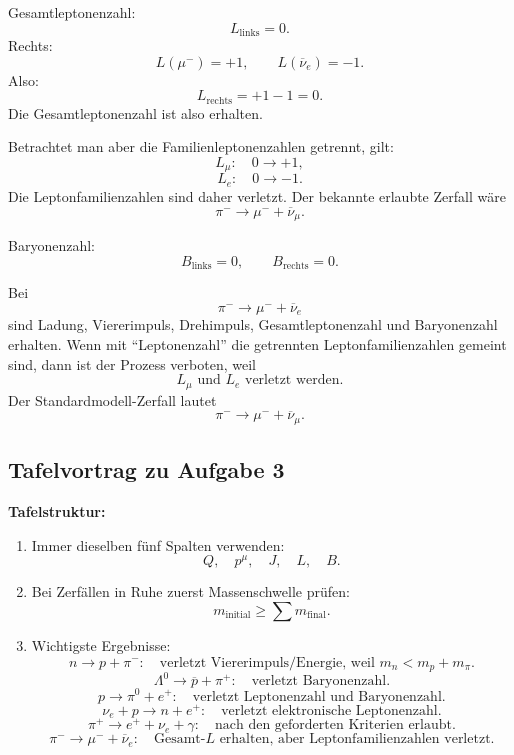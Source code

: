 \documentclass[11pt,a4paper]{scrartcl}
\theoremstyle{definition}
\theoremstyle{plain}
\theoremstyle{remark}
\begin{document}
\begin{enumerate}[label=(\alph*)]
\begin{calculationbox}
        Gesamtleptonenzahl:
        \[
            L_{\mathrm{links}}=0.
        \]
        Rechts:
        \[
            L(\mu^-)=+1,
            \qquad
            L(\overline\nu_e)=-1.
        \]
        Also:
        \[
            L_{\mathrm{rechts}}=+1-1=0.
        \]
        Die Gesamtleptonenzahl ist also erhalten.

        Betrachtet man aber die Familienleptonenzahlen getrennt, gilt:
        \[
            L_\mu:\quad 0\to +1,
        \]
        \[
            L_e:\quad 0\to -1.
        \]
        Die Leptonfamilienzahlen sind daher verletzt. Der bekannte erlaubte Zerfall wäre
        \[
            \pi^-\to\mu^-+\overline\nu_\mu.
        \]

        Baryonenzahl:
        \[
            B_{\mathrm{links}}=0,
            \qquad
            B_{\mathrm{rechts}}=0.
        \]
    \end{calculationbox}

    \begin{answerbox}
        Bei
        \[
            \pi^-\to\mu^-+\overline\nu_e
        \]
        sind Ladung, Viererimpuls, Drehimpuls, Gesamtleptonenzahl und Baryonenzahl erhalten. Wenn mit \enquote{Leptonenzahl} die getrennten Leptonfamilienzahlen gemeint sind, dann ist der Prozess verboten, weil
        \[
            \boxed{L_\mu\text{ und }L_e\text{ verletzt werden}.}
        \]
        Der Standardmodell-Zerfall lautet
        \[
            \boxed{\pi^-\to\mu^-+\overline\nu_\mu.}
        \]
    \end{answerbox}
\end{enumerate}

\subsection{Tafelvortrag zu Aufgabe 3}

\begin{talkbox}
\textbf{Tafelstruktur:}
\begin{enumerate}
    \item Immer dieselben fünf Spalten verwenden:
    \[
        Q,\quad p^\mu,\quad J,\quad L,\quad B.
    \]
    \item Bei Zerfällen in Ruhe zuerst Massenschwelle prüfen:
    \[
        m_{\mathrm{initial}}\ge\sum m_{\mathrm{final}}.
    \]
    \item Wichtigste Ergebnisse:
    \[
        n\to p+\pi^-:
        \quad
        \text{verletzt Viererimpuls/Energie, weil }m_n<m_p+m_\pi.
    \]
    \[
        \Lambda^0\to\overline p+\pi^+:
        \quad
        \text{verletzt Baryonenzahl.}
    \]
    \[
        p\to\pi^0+e^+:
        \quad
        \text{verletzt Leptonenzahl und Baryonenzahl.}
    \]
    \[
        \nu_e+p\to n+e^+:
        \quad
        \text{verletzt elektronische Leptonenzahl.}
    \]
    \[
        \pi^+\to e^+ + \nu_e+\gamma:
        \quad
        \text{nach den geforderten Kriterien erlaubt.}
    \]
    \[
        \pi^-\to\mu^-+\overline\nu_e:
        \quad
        \text{Gesamt-}L\text{ erhalten, aber Leptonfamilienzahlen verletzt.}
    \]
\end{enumerate}
\end{talkbox}
\end{document}
